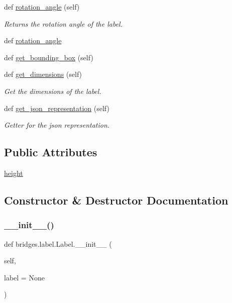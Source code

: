 \begin{DoxyCompactItemize}
def \hyperlink{classbridges_1_1label_1_1_label_a7cd3059914a296d1c3aedce98a72fd3a}{rotation\+\_\+angle} (self)
\begin{DoxyCompactList}\small\item\em Returns the rotation angle of the label. \end{DoxyCompactList}\item 
def \hyperlink{classbridges_1_1label_1_1_label_a57bb4d64af04a91452f0991b10750795}{rotation\+\_\+angle}
\item 
def \hyperlink{classbridges_1_1label_1_1_label_a11238ce7c802801d3a978fa367cc66f0}{get\+\_\+bounding\+\_\+box} (self)
\item 
def \hyperlink{classbridges_1_1label_1_1_label_a627bc596c7e3db837e3b1575282e1b98}{get\+\_\+dimensions} (self)
\begin{DoxyCompactList}\small\item\em Get the dimensions of the label. \end{DoxyCompactList}\item 
def \hyperlink{classbridges_1_1label_1_1_label_a5075b73938ca71eed43af12f26a71842}{get\+\_\+json\+\_\+representation} (self)
\begin{DoxyCompactList}\small\item\em Getter for the json representation. \end{DoxyCompactList}\end{DoxyCompactItemize}
\subsection*{Public Attributes}
\begin{DoxyCompactItemize}
\item 
\hyperlink{classbridges_1_1label_1_1_label_a2bf622aa77b4ad7d6918db99a8bfd4da}{height}
\end{DoxyCompactItemize}


\subsection{Constructor \& Destructor Documentation}
\mbox{\label{classbridges_1_1label_1_1_label_a9a6a9ba4ccb2757f0577d741d730c95c}} 
\subsubsection{\texorpdfstring{\+\_\+\+\_\+init\+\_\+\+\_\+()}{\_\_init\_\_()}}
{\footnotesize\ttfamily def bridges.\+label.\+Label.\+\_\+\+\_\+init\+\_\+\+\_\+ (\begin{DoxyParamCaption}\item[{}]{self,  }\item[{}]{label = {\ttfamily None} }\end{DoxyParamCaption})}



